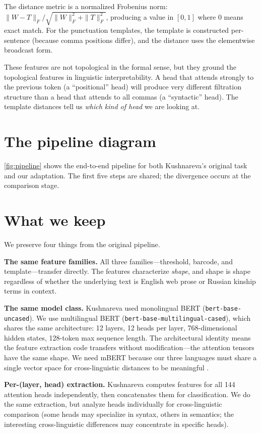 The distance metric is a normalized Frobenius norm: $\|W - T\|_F / \sqrt{\|W\|_F^2 + \|T\|_F^2}$, producing a value in $[0, 1]$ where 0 means exact match. For the punctuation templates, the template is constructed per-sentence (because comma positions differ), and the distance uses the elementwise broadcast form.

These features are not topological in the formal sense, but they ground the topological features in linguistic interpretability. A head that attends strongly to the previous token (a ``positional'' head) will produce very different filtration structure than a head that attends to all commas (a ``syntactic'' head). The template distances tell us \emph{which kind of head} we are looking at.

\section{The pipeline diagram}

\autoref{fig:pipeline} shows the end-to-end pipeline for both Kushnareva's original task and our adaptation. The first five steps are shared; the divergence occurs at the comparison stage.



\section{What we keep}

We preserve four things from the original pipeline.

\textbf{The same feature families.} All three families---threshold, barcode, and template---transfer directly. The features characterize \emph{shape}, and shape is shape regardless of whether the underlying text is English web prose or Russian kinship terms in context.

\textbf{The same model class.} Kushnareva used monolingual BERT (\texttt{bert-base-uncased}). We use multilingual BERT (\texttt{bert-base-multilingual-cased}), which shares the same architecture: 12 layers, 12 heads per layer, 768-dimensional hidden states, 128-token max sequence length. The architectural identity means the feature extraction code transfers without modification---the attention tensors have the same shape. We need mBERT because our three languages must share a single vector space for cross-linguistic distances to be meaningful \parencite{pires2019}.

\textbf{Per-(layer, head) extraction.} Kushnareva computes features for all 144 attention heads independently, then concatenates them for classification. We do the same extraction, but analyze heads individually for cross-linguistic comparison (some heads may specialize in syntax, others in semantics; the interesting cross-linguistic differences may concentrate in specific heads).

